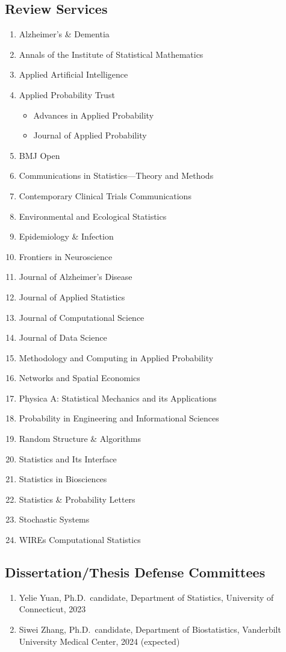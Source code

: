 \documentclass[12pt]{article}
\begin{document}
	\subsection*{Review Services}
	\begin{enumerate}
		\item Alzheimer's \& Dementia
		\item Annals of the Institute of Statistical Mathematics
		\item Applied Artificial Intelligence
		\item Applied Probability Trust
		\begin{itemize}
			\item Advances in Applied Probability 
			\item Journal of Applied Probability
		\end{itemize}
		\item BMJ Open
		\item Communications in Statistics---Theory and Methods
		\item Contemporary Clinical Trials Communications
		\item Environmental and Ecological Statistics
		\item Epidemiology \& Infection
		\item Frontiers in Neuroscience
		\item Journal of Alzheimer's Disease
		\item Journal of Applied Statistics
		\item Journal of Computational Science 
		\item Journal of Data Science
		\item Methodology and Computing in Applied Probability
		\item Networks and Spatial Economics
		\item Physica A: Statistical Mechanics and its Applications
		\item Probability in Engineering and Informational Sciences
		\item Random Structure \& Algorithms
		\item Statistics and Its Interface
		\item Statistics in Biosciences
		\item Statistics \& Probability Letters
		\item Stochastic Systems
		\item WIREs Computational Statistics
	\end{enumerate}
	
	\subsection*{Dissertation/Thesis Defense Committees}
	\begin{enumerate}
		\item Yelie Yuan, Ph.D.\ candidate, Department of 
		Statistics, University of Connecticut, 2023
		\item Siwei Zhang, Ph.D.\ candidate, Department of 
		Biostatistics, Vanderbilt University Medical Center, 2024 
		(expected)
	\end{enumerate}
	
\end{document}
